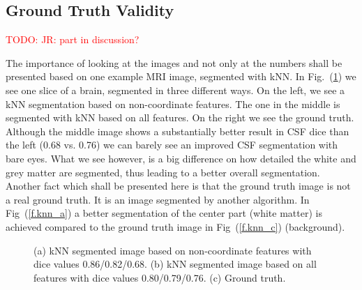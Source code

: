 \documentclass[journal]{IEEEtran}
\newcommand\TODO[1]{\textcolor{red}{TODO: #1}}
\begin{document}
\subsection{Ground Truth Validity}
\TODO{JR: part in discussion?}

The importance of looking at the images and not only at the numbers shall be presented based on one example MRI image, segmented with kNN. In Fig.~(\ref{f.ground_truth}) we see one slice of a brain, segmented in three different ways. On the left, we see a kNN segmentation based on non-coordinate features. The one in the middle is segmented with kNN based on all features. On the right we see the ground truth. Although the middle image shows a substantially better result in CSF dice than the left (0.68 vs. 0.76) we can barely see an improved CSF segmentation with bare eyes. What we see however, is a big difference on how detailed the white and grey matter are segmented, thus leading to a better overall segmentation. Another fact which shall be presented here is that the ground truth image is not a real ground truth. It is an image segmented by another algorithm. In Fig~(\ref{f.knn_a}) a better segmentation of the center part (white matter) is achieved compared to the ground truth image in Fig~(\ref{f.knn_c}) (background).

\begin{figure}
	\centering
	\hfill
	\hfill
	\caption{(a) kNN segmented image based on non-coordinate features with dice values 0.86/0.82/0.68. (b) kNN segmented image based on all features with dice values 0.80/0.79/0.76. (c) Ground truth.}
	\label{f.ground_truth}
\end{figure}
\end{document}
